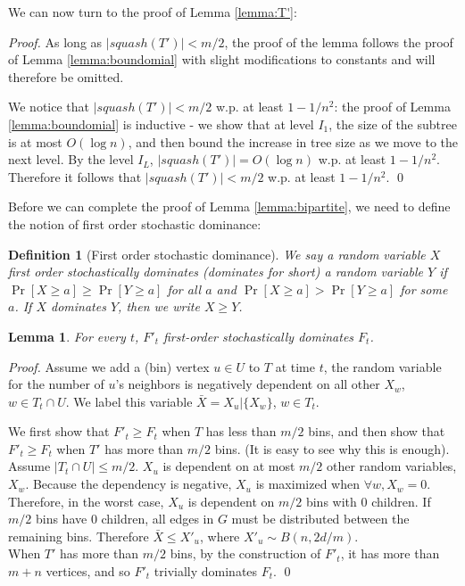 \documentclass[english, oribibl]{llncs}
\newtheorem{lemma}[theorem]{Lemma}
\newtheorem{definition}[theorem]{Definition}
\newcommand{\mygamma}{L}
\begin{document}
We can now turn to the proof of Lemma  \ref{lemma:T'}:

\begin{proof}

As long as $|squash(T')|< m/2$, the proof of the lemma follows the proof of Lemma \ref{lemma:boundomial}
with slight modifications to constants and will therefore be omitted. 

We notice that $|squash(T')|<m/2$ w.p. at least $1-1/n^2$: the proof of  Lemma \ref{lemma:boundomial} is inductive - we show that at level $I_1$,
the size of the subtree is at most $O(\log n)$, and then bound the increase in tree size
as we move to the next level. 
By the level $I_\mygamma$, $|squash(T')|=O(\log n)$ w.p. at least $1-1/n^2$. Therefore 
it follows that $|squash(T')|<m/2$ w.p. at least $1-1/n^2$. \qed
\end{proof}

Before we can complete the proof of Lemma \ref{lemma:bipartite}, we need to define the notion of first order stochastic dominance:

\begin{definition}[First order stochastic dominance]
We say a random variable $X$ \emph{first order stochastically dominates} (\emph{dominates} for short)
a random variable $Y$ if $\Pr[X \geq a] \geq \Pr[Y \geq a]$ for all $a$ and $\Pr[X\geq a] > \Pr[Y\geq a]$ for some $a$.
If $X$ dominates $Y$, then we write $X \geq Y$.
\end{definition}
\begin{lemma}
\label{lemma:stochastic dominance}
For every $t$, $F'_t$ first-order stochastically dominates $F_t$. \end{lemma}

\begin{proof}
Assume we add a (bin) vertex $u \in U$ to $T$ at time $t$, the random variable for the number of $u$'s neighbors
is negatively dependent on all other $X_w$, $w \in T_{t} \cap U$. We label this variable $\bar{X} = X_u|\{X_w\}$, $w \in T_{t}$. 

We first show that $F'_t \geq F_t$ when $T$ has less than $m/2$ bins, and then show that $F'_t \geq F_t$ when $T'$ has more than $m/2$ bins. (It is easy to see why this is enough).\\
Assume $|T_{t}\cap U| \leq m/2$. $X_u$ is dependent on at most $m/2$ other random variables, $X_w$. Because the dependency is negative, $X_u$  is maximized when $\forall w, X_w = 0$. Therefore, in the worst case, $X_u$ is dependent on $m/2$ bins with $0$ children. If $m/2$ bins have $0$ children, all edges in $G$ must be distributed between the remaining bins. Therefore $\bar{X} \leq X'_u$, where $X'_u \sim B(n, 2d/m)$.\\
When $T'$ has more than $m/2$ bins, by the construction of $F'_t$, it has more than $m+n$ vertices, and so $F'_t$ trivially dominates $F_t$. \qed
\end{proof}
\end{document}
